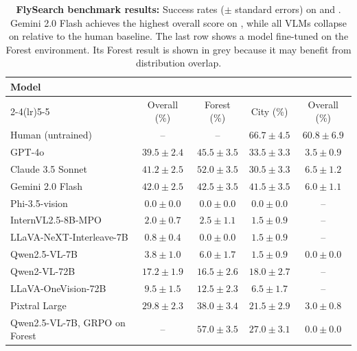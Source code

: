 \begin{table}[t]
    \centering
    \begin{footnotesize}
    \caption[FlySearch benchmark results on \challenge{} and \hardchallenge{}]{\textbf{FlySearch benchmark results:} Success rates ($\pm$ standard errors) on \challenge{} and \hardchallenge{}. Gemini 2.0 Flash achieves the highest overall score on \challenge{}, while all VLMs collapse on \hardchallenge{} relative to the human baseline. The last row shows a model fine-tuned on the Forest environment. Its Forest result is shown in grey because it may benefit from distribution overlap.}
    \label{tab:flysearch-main-results}
    \begin{tabular}{lcccc}
        \toprule
        \multirow{2}{*}{Model} & \multicolumn{3}{c}{\challenge{}} & \hardchallenge{} \\
        \cmidrule(lr){2-4}\cmidrule(lr){5-5}
         & Overall (\%) & Forest (\%) & City (\%) & Overall (\%) \\
        \midrule
        Human (untrained) & -- & -- & $66.7 \pm 4.5$ & $60.8 \pm 6.9$ \\
        \midrule
        GPT-4o & $39.5 \pm 2.4$ & $45.5 \pm 3.5$ & $33.5 \pm 3.3$ & $3.5 \pm 0.9$ \\
        Claude 3.5 Sonnet & $41.2 \pm 2.5$ & $\mathbf{52.0 \pm 3.5}$ & $30.5 \pm 3.3$ & $\mathbf{6.5 \pm 1.2}$ \\
        Gemini 2.0 Flash & $\mathbf{42.0 \pm 2.5}$ & $42.5 \pm 3.5$ & $\mathbf{41.5 \pm 3.5}$ & $6.0 \pm 1.1$ \\
        \midrule
        Phi-3.5-vision & $0.0 \pm 0.0$ & $0.0 \pm 0.0$ & $0.0 \pm 0.0$ & -- \\
        InternVL2.5-8B-MPO & $2.0 \pm 0.7$ & $2.5 \pm 1.1$ & $1.5 \pm 0.9$ & -- \\
        LLaVA-NeXT-Interleave-7B & $0.8 \pm 0.4$ & $0.0 \pm 0.0$ & $1.5 \pm 0.9$ & -- \\
        Qwen2.5-VL-7B & $3.8 \pm 1.0$ & $6.0 \pm 1.7$ & $1.5 \pm 0.9$ & $0.0 \pm 0.0$ \\
        \midrule
        Qwen2-VL-72B & $17.2 \pm 1.9$ & $16.5 \pm 2.6$ & $18.0 \pm 2.7$ & -- \\
        LLaVA-OneVision-72B & $9.5 \pm 1.5$ & $12.5 \pm 2.3$ & $6.5 \pm 1.7$ & -- \\
        Pixtral Large & $29.8 \pm 2.3$ & $38.0 \pm 3.4$ & $21.5 \pm 2.9$ & $3.0 \pm 0.8$ \\
        \midrule
        Qwen2.5-VL-7B, GRPO on Forest & -- & \color{gray}$57.0 \pm 3.5$ & $27.0 \pm 3.1$ & $0.0 \pm 0.0$ \\
        \bottomrule
    \end{tabular}
    \end{footnotesize}
\end{table}

